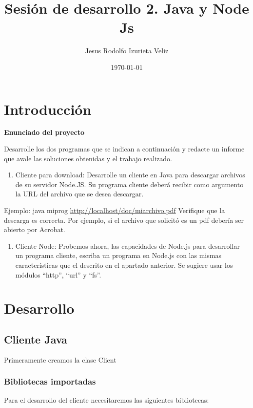 \documentclass[11pt]{article}
\author{Jesus Rodolfo Izurieta Veliz}
\date{\today}
\title{Sesión de desarrollo 2. Java y Node Js}
\begin{document}
\maketitle
\tableofcontents

\pagebreak

\section{Introducción}
\label{sec:org90def18}
\textbf{Enunciado del proyecto}

Desarrolle los dos programas que se indican a continuación y redacte un informe que avale las soluciones obtenidas y el trabajo realizado.

\begin{enumerate}
\item Cliente para download: Desarrolle un cliente en Java para descargar archivos de su servidor Node.JS. Su programa cliente deberá recibir como argumento la URL del archivo que se desea descargar.
\end{enumerate}
Ejemplo: java miprog \url{http://localhost/doc/miarchivo.pdf}
Verifique que la descarga es correcta. Por ejemplo, si el archivo que solicitó es un pdf debería ser abierto por Acrobat.

\begin{enumerate}
\item Cliente Node: Probemos ahora, las capacidades de Node.js para desarrollar un programa cliente, escriba un programa en Node.js con las mismas características que el descrito en el apartado anterior. Se sugiere usar los módulos “http”, “url” y “fs”.
\end{enumerate}

\section{Desarrollo}
\label{sec:org30e0fef}

\subsection{Cliente Java}
\label{sec:orgde949f8}
Primeramente creamos la clase Client
\subsubsection{Bibliotecas importadas}
\label{sec:org2917df3}
Para el desarrollo del cliente necesitaremos las siguientes bibliotecas:
\end{document}
